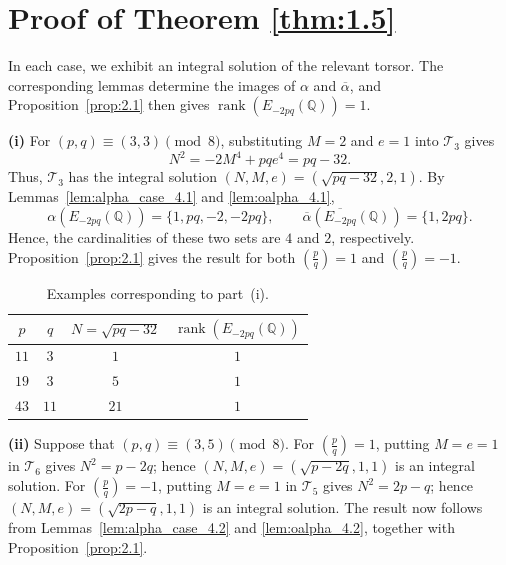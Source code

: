 \documentclass[12pt]{amsart}
\newcommand{\bbQ}{\mathbb{Q}}
\newcommand{\cT}{\mathcal{T}}
\newcommand{\legendre}[2]{\genfrac{(}{)}{}{}{#1}{#2}}
\numberwithin{equation}{section}
\theoremstyle{definition}
\begin{document}




\section{Proof of Theorem \ref{thm:1.5}}
In each case, we exhibit an integral solution of the relevant torsor.
The corresponding lemmas determine the images of $\alpha$ and
$\overline{\alpha}$, and Proposition~\ref{prop:2.1} then gives
$\operatorname{rank}(E_{-2pq}(\bbQ))=1$.

\smallskip
\noindent\textbf{(i)}
For $(p,q)\equiv(3,3)\pmod 8$, substituting $M=2$ and $e=1$ into
$\cT_3$ gives
\[
N^2=-2M^4+pqe^4=pq-32.
\]
Thus, $\cT_3$ has the integral solution
$(N,M,e)=(\sqrt{pq-32},2,1)$. By
Lemmas~\ref{lem:alpha_case_4.1} and \ref{lem:oalpha_4.1},
\[
\alpha(E_{-2pq}(\bbQ))=\{1,pq,-2,-2pq\},
\qquad
\overline{\alpha}(\overline{E_{-2pq}}(\bbQ))
=\{1,2pq\}.
\]
Hence, the cardinalities of these two sets are $4$ and $2$,
respectively. Proposition~\ref{prop:2.1} gives the result for both
$\legendre{p}{q}=1$ and $\legendre{p}{q}=-1$.

\begin{table}[!ht]
\centering
\scriptsize
\renewcommand{\arraystretch}{0.9}
\setlength{\tabcolsep}{5pt}
\begin{tabular}{cccc}
\hline
$p$ & $q$ & $N=\sqrt{pq-32}$ &
$\operatorname{rank}(E_{-2pq}(\bbQ))$\\
\hline
$11$ & $3$  & $1$  & $1$\\
$19$ & $3$  & $5$  & $1$\\
$43$ & $11$ & $21$ & $1$\\
\hline
\end{tabular}
\caption{Examples corresponding to part~\textup{(i)}.}
\label{tab:4}
\end{table}

\smallskip
\noindent\textbf{(ii)}
Suppose that $(p,q)\equiv(3,5)\pmod 8$.
For $\legendre{p}{q}=1$, putting $M=e=1$ in $\cT_6$ gives
$N^2=p-2q$; hence
$(N,M,e)=(\sqrt{p-2q},1,1)$ is an integral solution.
For $\legendre{p}{q}=-1$, putting $M=e=1$ in $\cT_5$ gives
$N^2=2p-q$; hence
$(N,M,e)=(\sqrt{2p-q},1,1)$ is an integral solution.
The result now follows from
Lemmas~\ref{lem:alpha_case_4.2} and \ref{lem:oalpha_4.2},
together with Proposition~\ref{prop:2.1}.
\end{document}
